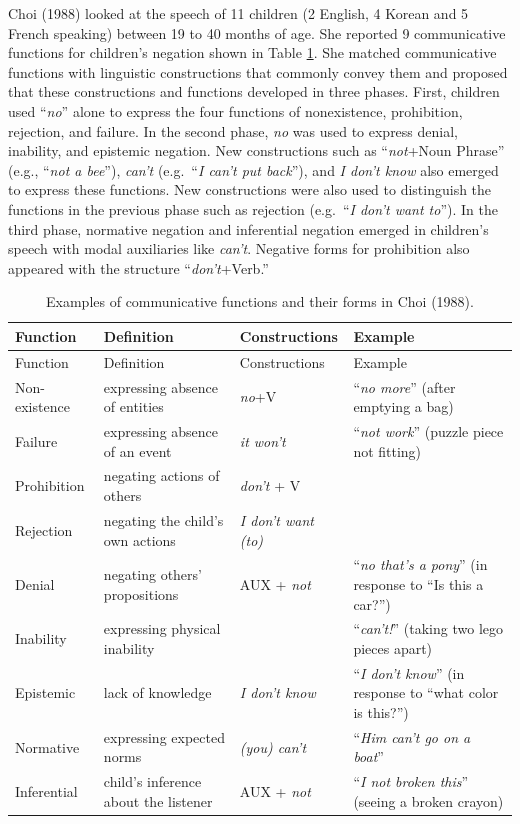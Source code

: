 \documentclass[
  english,
  man,floatsintext]{apa6}
\begin{document}
Choi (1988) looked at the speech of 11 children (2 English, 4 Korean and 5 French speaking) between 19 to 40 months of age. She reported 9 communicative functions for children's negation shown in Table \ref{tab:choi}. She matched communicative functions with linguistic constructions that commonly convey them and proposed that these constructions and functions developed in three phases. First, children used ``\emph{no}'' alone to express the four functions of nonexistence, prohibition, rejection, and failure. In the second phase, \emph{no} was used to express denial, inability, and epistemic negation. New constructions such as ``\emph{not}+Noun Phrase'' (e.g., ``\emph{not a bee}''), \emph{can't} (e.g.~``\emph{I can't put back}''), and \emph{I don't know} also emerged to express these functions. New constructions were also used to distinguish the functions in the previous phase such as rejection (e.g.~``\emph{I don't want to}''). In the third phase, normative negation and inferential negation emerged in children's speech with modal auxiliaries like \emph{can't}. Negative forms for prohibition also appeared with the structure ``\emph{don't}+Verb.''

\begin{longtable}[]{@{}
  >{\raggedright\arraybackslash}p{}
  >{\raggedright\arraybackslash}p{}
  >{\raggedright\arraybackslash}p{}
  >{\raggedright\arraybackslash}p{}@{}}
\caption{\label{tab:choi} Examples of communicative functions and their forms in Choi (1988).}\tabularnewline
\toprule
Function & Definition & Constructions & Example \\
\midrule
\endfirsthead
\toprule
Function & Definition & Constructions & Example \\
\midrule
\endhead
Non-existence & expressing absence of entities & \emph{no}+V & ``\emph{no more}'' (after emptying a bag) \\
Failure & expressing absence of an event & \emph{it won't} & ``\emph{not work}'' (puzzle piece not fitting) \\
Prohibition & negating actions of others & \emph{don't} + V & \\
Rejection & negating the child's own actions & \emph{I don't want (to)} & \\
Denial & negating others' propositions & AUX + \emph{not} & ``\emph{no that's a pony}'' (in response to ``Is this a car?'') \\
Inability & expressing physical inability & & ``\emph{can't!}'' (taking two lego pieces apart) \\
Epistemic & lack of knowledge & \emph{I don't know} & ``\emph{I don't know}'' (in response to ``what color is this?'') \\
Normative & expressing expected norms & \emph{(you) can't} & ``\emph{Him can't go on a boat}'' \\
Inferential & child's inference about the listener & AUX + \emph{not} & ``\emph{I not broken this}'' (seeing a broken crayon) \\
\bottomrule
\end{longtable}
\end{document}
